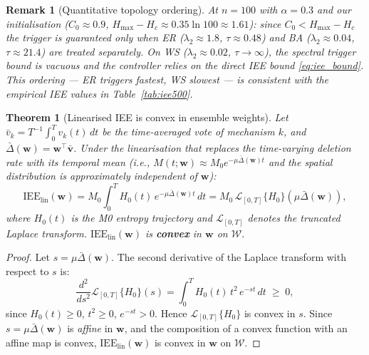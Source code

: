 \documentclass[review,12pt]{elsarticle}
\newcommand{\bfw}{\mathbf{w}}
\newcommand{\bfv}{\mathbf{v}}
\newcommand{\IEE}{\mathrm{IEE}}
\newcommand{\Hc}{H_c}
\newcommand{\Hmax}{H_{\max}}
\newcommand{\lambdat}{\lambda_2}
\newtheorem{theorem}{Theorem}
\newtheorem{remark}{Remark}
\begin{document}
\begin{remark}[Quantitative topology ordering]
\label{rem:lambda2}
At $n=100$ with $\alpha=0.3$ and our initialisation ($C_0\approx 0.9$,
$\Hmax-\Hc\approx 0.35\ln 100 \approx 1.61$): since $C_0 < \Hmax-\Hc$
the trigger is guaranteed only when ER ($\lambdat\approx 1.8$, $\tau\approx
0.48$) and BA ($\lambdat\approx 0.04$, $\tau\approx 21.4$) are treated
separately.  On WS ($\lambdat\approx 0.02$, $\tau\to\infty$), the spectral
trigger bound is vacuous and the controller relies on the direct IEE bound
\eqref{eq:iee_bound}.  This ordering --- ER triggers fastest, WS slowest
--- is consistent with the empirical IEE values in Table~\ref{tab:iee500}.
\end{remark}

\begin{theorem}[Linearised IEE is convex in ensemble weights]
\label{thm:lin_convex}
Let $\bar{v}_k = T^{-1}\!\int_0^T\! v_k(t)\,dt$ be the time-averaged vote
of mechanism $k$, and $\bar{\Delta}(\bfw) = \bfw^\top\bar{\bfv}$.
Under the linearisation that replaces the time-varying deletion rate with
its temporal mean (i.e., $M(t;\bfw) \approx M_0 e^{-\mu\bar{\Delta}(\bfw)t}$
and the spatial distribution is approximately independent of $\bfw$):
\begin{equation}
  \IEE_{\mathrm{lin}}(\bfw)
    = M_0 \int_0^T H_0(t)\,e^{-\mu\bar{\Delta}(\bfw)t}\,dt
    = M_0\,\mathcal{L}_{[0,T]}\{H_0\}\!\left(\mu\bar{\Delta}(\bfw)\right),
  \label{eq:iee_lin}
\end{equation}
where $H_0(t)$ is the M0 entropy trajectory and $\mathcal{L}_{[0,T]}$
denotes the truncated Laplace transform. $\IEE_{\mathrm{lin}}(\bfw)$ is
\textbf{convex} in $\bfw$ on $\mathcal{W}$.
\end{theorem}

\begin{proof}
Let $s = \mu\bar{\Delta}(\bfw)$.  The second derivative of the Laplace transform
with respect to $s$ is:
\begin{equation}
  \frac{d^2}{ds^2}\mathcal{L}_{[0,T]}\{H_0\}(s)
  = \int_0^T H_0(t)\,t^2\,e^{-st}\,dt \;\geq\; 0,
  \label{eq:laplace_convex}
\end{equation}
since $H_0(t)\geq 0$, $t^2\geq 0$, $e^{-st}>0$.  Hence
$\mathcal{L}_{[0,T]}\{H_0\}$ is convex in $s$.
Since $s = \mu\bar{\Delta}(\bfw)$ is \emph{affine} in $\bfw$, and the composition
of a convex function with an affine map is convex,
$\IEE_{\mathrm{lin}}(\bfw)$ is convex in $\bfw$ on $\mathcal{W}$.
\end{proof}
\end{document}
